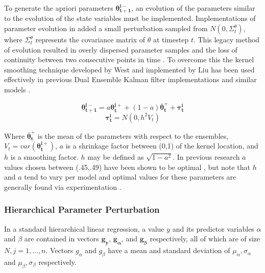 To generate the apriori parameters $\mathbf{\theta^{i-}_{t+1}}$, an evolution of the parameters similar to the evolution of the state variables must be implemented. Implementations of parameter evolution in \cite{TodiniESzollosi-NagyA1976} added a small perturbation sampled from $N(0,\Sigma^{\theta}_{t})$, where $\Sigma^{\theta}_{t}$ represents the covariance matrix of $\theta$ at timestep $t$. This legacy method of evolution resulted in overly dispersed parameter samples and the loss of continuity between two consecutive points in time \cite{Liu2000} \cite{Chen2008}. To overcome this the kernel smoothing technique developed by West \cite{West1993} and implemented by Liu \cite{Liu2000} has been used effectively in previous Dual Ensemble Kalman filter implementations \cite{Moradkhani2005} and similar models \cite{Chen2008}.

\begin{equation}\label{eq:hdekf_thetaminus_old}
\mathbf{\theta_{t+1}^{i-}} = a\mathbf{\theta_{t}^{i+}} + (1-a)\mathbf{\bar{\theta}_{t}^{+}} + \mathbf{\tau_{t}^{i}}
\end{equation}
\begin{equation}\label{eq:hdekf_tau_old}
\mathbf{\tau_{t}^{i}} = N(0, h^{2}V_{t})
\end{equation}

Where $\mathbf{\bar{\theta}_{t}^{+}}$ is the mean of the parameters with respect to the ensembles, $V_{t} = var(\mathbf{\theta_{t}^{i+}})$, $a$ is a shrinkage factor between (0,1) of the kernel location, and $h$ is a smoothing factor. $h$ may be defined as $\sqrt{1-a^{2}}$. In previous research $a$ values chosen between (.45,.49) have been shown to be optimal \cite{Chen2008}, but note that $h$ and $a$ tend to vary per model and optimal values for these parameters are generally found via experimentation  \cite{Moradkhani2005}  \cite{Anderson1999} \cite{Annan2005} \cite{Chen2008}.

\subsubsection{Hierarchical Parameter Perturbation}

In a standard hierarchical linear regression, a value $y$ and its predictor variables $\alpha$ and $\beta$ are contained in vectors $\mathbf{g_{y}}$, $\mathbf{g_{\alpha}}$, and $\mathbf{g_{\beta}}$ respectively, all of which are of size $N, j=1,...,n$. Vectors $g_{\alpha}$ and $g_{\beta}$ have a mean and standard deviation of $\mu_{\alpha}, \sigma_{\alpha}$ and $\mu_{\beta} , \sigma_{\beta}$ respectively.

